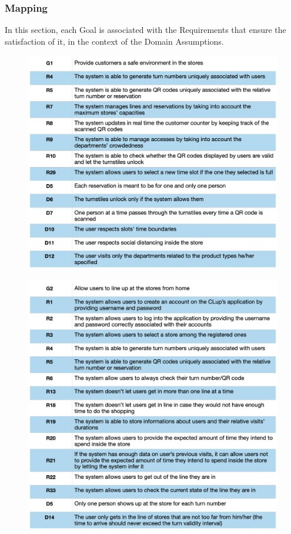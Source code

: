 \documentclass{article}
\begin{document}
\subsubsection{Mapping}
In this section, each Goal is associated with the Requirements that ensure the satisfaction of it, in the context of the Domain Assumptions.

\begin{figure}[H]
  \includegraphics[width=\linewidth]{Mapping1.png}
  
\end{figure}

\begin{figure}[H]
  \includegraphics[width=\linewidth]{Mapping2.png}
  
\end{figure}
\end{document}
